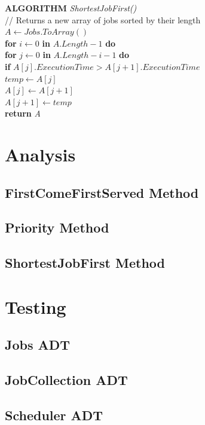 \documentclass[12pt,a4paper]{article}
\begin{document}
			\textbf{ALGORITHM} \textit{ShortestJobFirst()}\\
			\null\hspace{1cm}// Returns a new array of jobs sorted by their length\\
			\null\hspace{1cm}\textit{$A \gets Jobs.ToArray()$}\\
			\null\hspace{1cm}\textbf{for} \textit{$i \gets 0$} \textbf{in} \textit{$A.Length - 1$} \textbf{do}\\
			\null\hspace{2cm}\textbf{for} \textit{$j \gets 0$} \textbf{in} \textit{$A.Length - i - 1$} \textbf{do}\\
			\null\hspace{3cm}\textbf{if} \textit{$A[j].ExecutionTime > A[j + 1].ExecutionTime$}\\
			\null\hspace{4cm}\textit{$temp \gets A[j]$}\\
			\null\hspace{4cm}\textit{$A[j] \gets A[j + 1]$}\\
			\null\hspace{4cm}\textit{$A[j + 1] \gets temp$}\\
			\null\hspace{1cm}\textbf{return} \textit{A}\\
	\section{Analysis}
		\subsection{FirstComeFirstServed Method}
		\subsection{Priority Method}
		\subsection{ShortestJobFirst Method}

	\section{Testing}
		\subsection{Jobs ADT}
		\subsection{JobCollection ADT}
		\subsection{Scheduler ADT}
\end{document}
